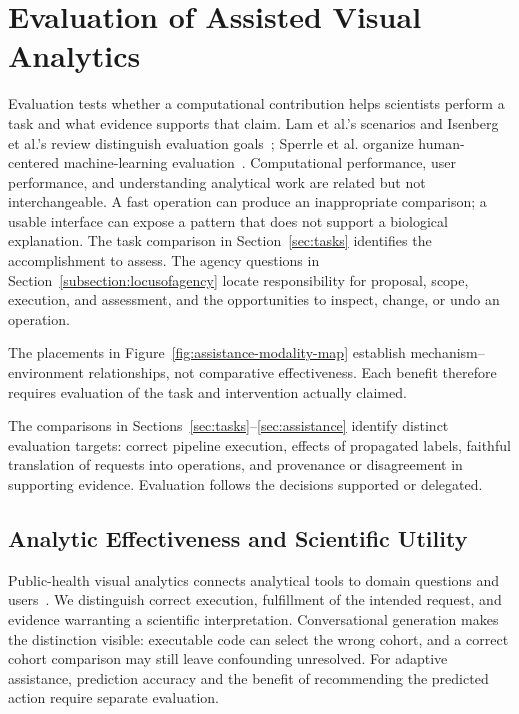 \section{Evaluation of Assisted Visual Analytics}
\label{sec:evaluation}
Evaluation tests whether a computational contribution helps scientists perform a task and what evidence supports that claim. Lam et al.'s scenarios and Isenberg et al.'s review distinguish evaluation goals~\cite{Lam2012SevenScenarios,EvalIsenberg2013}; Sperrle et al. organize human-centered machine-learning evaluation~\cite{Sperrle2021HumanCenteredEvaluation}. Computational performance, user performance, and understanding analytical work are related but not interchangeable. A fast operation can produce an inappropriate comparison; a usable interface can expose a pattern that does not support a biological explanation. The task comparison in Section~\ref{sec:tasks} identifies the accomplishment to assess. The agency questions in Section~\ref{subsection:locusofagency} locate responsibility for proposal, scope, execution, and assessment, and the opportunities to inspect, change, or undo an operation.

The placements in Figure~\ref{fig:assistance-modality-map} establish mechanism--environment relationships, not comparative effectiveness. Each benefit therefore requires evaluation of the task and intervention actually claimed.

The comparisons in Sections~\ref{sec:tasks}--\ref{sec:assistance} identify distinct evaluation targets: correct pipeline execution, effects of propagated labels, faithful translation of requests into operations, and provenance or disagreement in supporting evidence. Evaluation follows the decisions supported or delegated.

\subsection{Analytic Effectiveness and Scientific Utility}
\label{sec:evaluation-effectiveness}
Public-health visual analytics connects analytical tools to domain questions and users~\cite{Preim2020PublicHealth}. We distinguish correct execution, fulfillment of the intended request, and evidence warranting a scientific interpretation. Conversational generation makes the distinction visible: executable code can select the wrong cohort, and a correct cohort comparison may still leave confounding unresolved. For adaptive assistance, prediction accuracy and the benefit of recommending the predicted action require separate evaluation.


